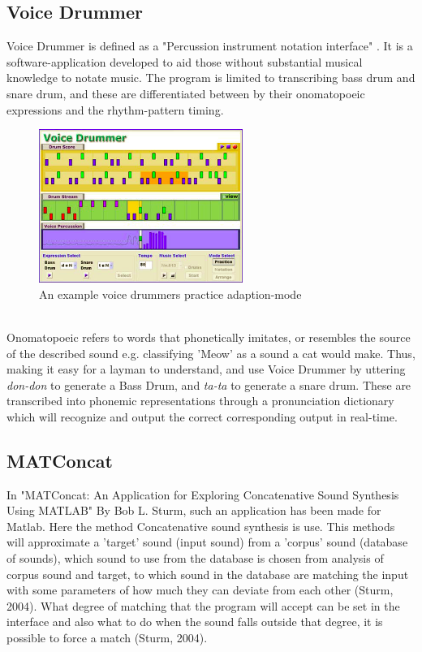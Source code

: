 \subsection{ Voice Drummer }
Voice Drummer is defined as a "Percussion instrument notation interface" \citep{VoiceDrummer}. It is a software-application developed to aid those without substantial musical knowledge to notate music. The program is limited to transcribing bass drum and snare drum, and these are differentiated between by their onomatopoeic expressions and the rhythm-pattern timing.
\\
\begin{figure}[h]
	\begin{center}
		\includegraphics[height=5cm]{fig/VoiceDrummer.png}
		\caption{An example voice drummers practice adaption-mode \citep{VoiceDrummer}}
		\label{VoiceDrummer}
	\end{center}
\end{figure}
\\
Onomatopoeic refers to words that phonetically imitates, or resembles the source of the described sound e.g. classifying 'Meow' as a sound a cat would make. Thus, making it easy for a layman to understand, and use Voice Drummer by uttering \textit{don-don} to generate a Bass Drum, and \textit{ta-ta} to generate a snare drum. These are transcribed into phonemic representations through a pronunciation dictionary which will recognize and
 output the correct corresponding output in real-time.

\subsection{ MATConcat }
In "MATConcat: An Application for Exploring Concatenative Sound Synthesis Using MATLAB"  By Bob L. Sturm, such an application has been made for Matlab. Here the method Concatenative sound synthesis is use. This methods will approximate a 'target' sound (input sound) from a 'corpus' sound (database of sounds), which sound to use from the database is chosen from analysis of corpus sound and target, to which sound in the database are matching the input with some parameters of how much they can deviate from each other (Sturm, 2004). What degree of matching that the program will accept can be set in the interface and also what to do when the sound falls outside that degree, it is possible to force a match (Sturm, 2004).


